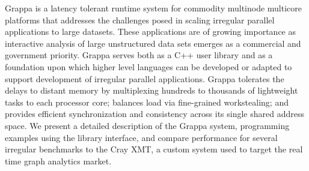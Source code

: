 Grappa is a latency tolerant runtime system for commodity multinode multicore
platforms that addresses the challenges posed in scaling irregular parallel
applications to large datasets. These applications are of growing importance
as interactive analysis of large unstructured data sets emerges as a
commercial and government priority. Grappa serves both as a C++ user library
and as a foundation upon which higher level languages can be developed or
adapted to support development of irregular parallel applications. Grappa
tolerates the delays to distant memory by multiplexing hundreds to thousands
of lightweight tasks to each processor core; balances load via fine-grained
workstealing; and provides efficient synchronization and consistency across
its single shared address space. We present a detailed description
of the Grappa system, programming examples using the library interface, and
compare performance for several irregular benchmarks to the Cray XMT, a custom
system used to target the real time graph analytics market.